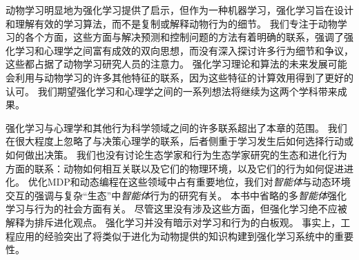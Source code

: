 动物学习明显地为强化学习提供了启示，但作为一种机器学习，强化学习旨在设计和理解有效的学习算法，而不是复制或解释动物行为的细节。
我们专注于动物学习的各个方面，这些方面与解决预测和控制问题的方法有着明确的联系，强调了强化学习和心理学之间富有成效的双向思想，而没有深入探讨许多行为细节和争议，这些都占据了动物学习研究人员的注意力。
强化学习理论和算法的未来发展可能会利用与动物学习的许多其他特征的联系，因为这些特征的计算效用得到了更好的认可。
我们期望强化学习和心理学之间的一系列想法将继续为这两个学科带来成果。


强化学习与心理学和其他行为科学领域之间的许多联系超出了本章的范围。
我们在很大程度上忽略了与决策心理学的联系，后者侧重于学习发生后如何选择行动或如何做出决策。
我们也没有讨论生态学家和行为生态学家研究的生态和进化行为方面的联系：动物如何相互关联以及它们的物理环境，以及它们的行为如何促进进化。
优化MDP和动态编程在这些领域中占有重要地位，我们对\textit{智能体}与动态环境交互的强调与复杂“生态”中\textit{智能体}行为的研究有关。
本书中省略的多\textit{智能体}强化学习与行为的社会方面有关。
尽管这里没有涉及这些方面，但强化学习绝不应被解释为排斥进化观点。
强化学习并没有暗示对学习和行为的白板观。
事实上，工程应用的经验突出了将类似于进化为动物提供的知识构建到强化学习系统中的重要性。





